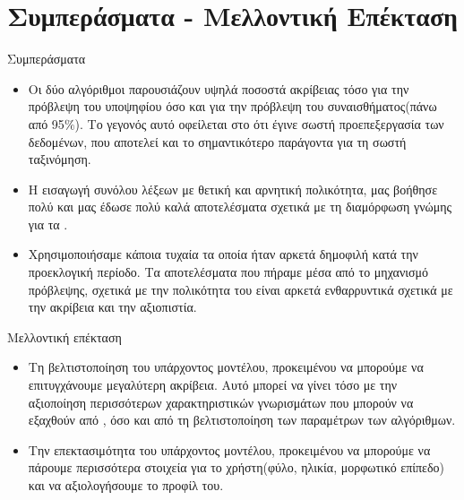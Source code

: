 \documentclass{beamer}
\begin{document}
\section{Συμπεράσματα - Μελλοντική Επέκταση}
\begin{frame}
\begin{flushleft}
{\color{blue}Συμπεράσματα} 
\end{flushleft}
\vfill
\begin{itemize}
\item Οι δύο αλγόριθμοι παρουσιάζουν υψηλά ποσοστά ακρίβειας τόσο για την πρόβλεψη του υποψηφίου όσο και για την πρόβλεψη του συναισθήματος(πάνω από 95$\%$). Το γεγονός αυτό οφείλεται στο ότι έγινε σωστή προεπεξεργασία των δεδομένων, που αποτελεί και το σημαντικότερο παράγοντα για τη σωστή ταξινόμηση.
\item H εισαγωγή συνόλου λέξεων με θετική και αρνητική πολικότητα, μας βοήθησε πολύ και μας έδωσε πολύ καλά αποτελέσματα σχετικά με τη διαμόρφωση γνώμης για τα {}.
\item Χρησιμοποιήσαμε κάποια τυχαία {} τα οποία ήταν αρκετά δημοφιλή κατά την προεκλογική περίοδο. Τα αποτελέσματα που πήραμε μέσα από το μηχανισμό πρόβλεψης, σχετικά με την πολικότητα του {} είναι αρκετά ενθαρρυντικά σχετικά με την ακρίβεια και την αξιοπιστία.
\end{itemize}
\end{frame}

\begin{frame}
\begin{flushleft}
{\color{blue}Μελλοντική επέκταση} 
\end{flushleft}
\vfill
\begin{itemize}
\item Τη βελτιστοποίηση του υπάρχοντος μοντέλου, προκειμένου να μπορούμε να επιτυγχάνουμε μεγαλύτερη ακρίβεια. Αυτό μπορεί να γίνει τόσο με την αξιοποίηση περισσότερων χαρακτηριστικών γνωρισμάτων που μπορούν να εξαχθούν από {}, όσο και από τη βελτιστοποίηση των παραμέτρων των αλγόριθμων.
\vfill
\item Την επεκτασιμότητα του υπάρχοντος μοντέλου, προκειμένου να μπορούμε να πάρουμε περισσότερα στοιχεία για το χρήστη(φύλο, ηλικία, μορφωτικό επίπεδο) και να αξιολογήσουμε το προφίλ του.
\vfill
\end{itemize}
\end{frame}
\end{document}
